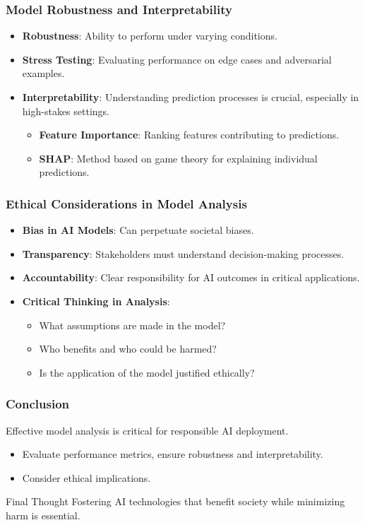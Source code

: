 \documentclass[aspectratio=169]{beamer}
\begin{document}
\begin{frame}[fragile]
    \frametitle{Model Robustness and Interpretability}
    \begin{itemize}
        \item \textbf{Robustness}: Ability to perform under varying conditions.
        \item \textbf{Stress Testing}: Evaluating performance on edge cases and adversarial examples.
        
        \item \textbf{Interpretability}: Understanding prediction processes is crucial, especially in high-stakes settings.
        \begin{itemize}
            \item \textbf{Feature Importance}: Ranking features contributing to predictions.
            \item \textbf{SHAP}: Method based on game theory for explaining individual predictions.
        \end{itemize}
    \end{itemize}
\end{frame}

\begin{frame}[fragile]
    \frametitle{Ethical Considerations in Model Analysis}
    \begin{itemize}
        \item \textbf{Bias in AI Models}: Can perpetuate societal biases.
        \item \textbf{Transparency}: Stakeholders must understand decision-making processes.
        \item \textbf{Accountability}: Clear responsibility for AI outcomes in critical applications.
        
        \item \textbf{Critical Thinking in Analysis}:
        \begin{itemize}
            \item What assumptions are made in the model?
            \item Who benefits and who could be harmed?
            \item Is the application of the model justified ethically?
        \end{itemize}
    \end{itemize} 
\end{frame}

\begin{frame}[fragile]
    \frametitle{Conclusion}
    Effective model analysis is critical for responsible AI deployment.
    \begin{itemize}
        \item Evaluate performance metrics, ensure robustness and interpretability.
        \item Consider ethical implications.
    \end{itemize}
    \begin{block}{Final Thought}
        Fostering AI technologies that benefit society while minimizing harm is essential.
    \end{block}
\end{frame}
\end{document}
